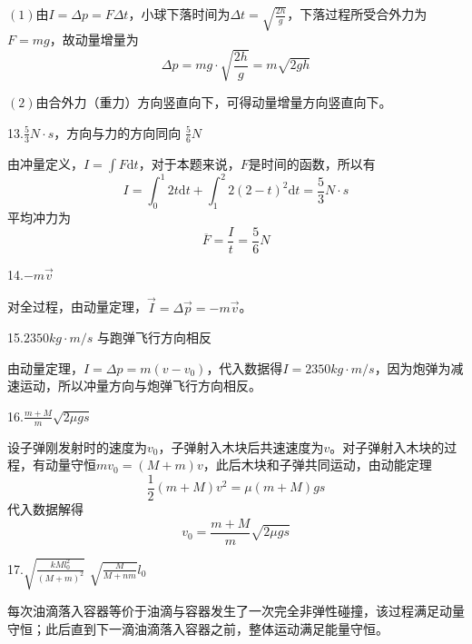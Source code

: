 \documentclass[b5paper,opensource]{./template/qyxf-book}
\newcommand{\di}[1]{\mathrm{d}#1}
\begin{document}
		$(1)$由$ I=\Delta p=F\Delta t $，小球下落时间为$\Delta t=\sqrt{\frac{2h}{g}}$，下落过程所受合外力为$F=mg$，故动量增量为
		\begin{equation*}
		\Delta p=mg\cdot\sqrt{\frac{2h}{g}}=m\sqrt{2gh}
		\end{equation*}
		
		$(2)$由合外力（重力）方向竖直向下，可得动量增量方向竖直向下。
		
		13.$\frac{5}{3}N\cdot s$，方向与力的方向同向 \hspace{2em} $\frac{5}{6}N$
		
		由冲量定义，$I = \int F \di t$，对于本题来说，$F$是时间的函数，所以有
		\begin{equation*}
		I = \int_0^1 2t \di t + \int_1^2 2(2-t)^2 \di t = \frac{5}{3}N \cdot s
		\end{equation*}
		平均冲力为
		\begin{equation*}
		\overline{F} = \frac{I}{t} = \frac{5}{6} N
		\end{equation*}
		
		14.$-m\vec{v}$
		
		对全过程，由动量定理，$\vec{I} = \Delta \vec{p} = -m\vec{v}$。
		
		15.$2350kg\cdot m/s$ \hspace{2em} 与跑弹飞行方向相反
		
		由动量定理，$I = \Delta p = m(v-v_0)$，代入数据得$I=2350kg\cdot m/s$，因为炮弹为减速运动，所以冲量方向与炮弹飞行方向相反。
		
		16.$\frac{m+M}{m}\sqrt{2 \mu gs}$
		
		设子弹刚发射时的速度为$v_0$，子弹射入木块后共速速度为$v$。对子弹射入木块的过程，有动量守恒$mv_0=(M+m)v$，此后木块和子弹共同运动，由动能定理
		\begin{equation*}
		\frac{1}{2}(m+M)v^2=\mu (m+M)gs
		\end{equation*}
		代入数据解得
		\begin{equation*}
		v_0=\frac{m+M}{m}\sqrt{2 \mu gs}
		\end{equation*}
		
		17.$\sqrt{\frac{kMl_0^2}{(M+m)^2}}$ \hspace{4em} $\sqrt{\frac{M}{M+nm}}l_0$
		
		\analysis 每次油滴落入容器等价于油滴与容器发生了一次完全非弹性碰撞，该过程满足动量守恒；此后直到下一滴油滴落入容器之前，整体运动满足能量守恒。
		
\end{document}

